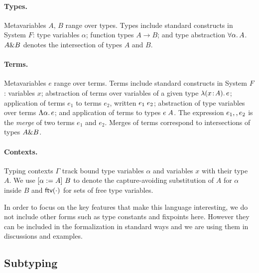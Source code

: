 \paragraph{Types.} Metavariables $A$, $B$ range over types. Types include
standard constructs in System $F$: type variables $\alpha$; function types $A
\to B$; and type abstraction $\forall \alpha.\, A$. $A \& B$ denotes the
intersection of types $A$ and $B$.

\paragraph{Terms.} Metavariables $e$ range over terms.  Terms include standard
constructs in System $F$: variables $x$; abstraction of terms over variables of
a given type $\lambda (x \!:\! A).\, e$; application of terms $e_1$ to terms $e_2$, written
$e_1 \; e_2$; abstraction of type variables over terms $\Lambda \alpha.\, e$;
and application of terms to types $e \; A$. The expression $e_1 ,, e_2$ is the
\emph{merge} of two terms $e_1$ and $e_2$.
Merges of terms correspond to intersections of types $A \& B$.

\paragraph{Contexts.} Typing contexts $ \Gamma $ track bound type variables
$\alpha$ and variables $x$ with their type $A$. We use $\lbrack \alpha := A \rbrack~ {B}$
to denote the capture-avoiding substitution of $A$ for $\alpha$ inside $B$ and
$\textsf{ftv}(\cdot)$ for sets of free type variables.

In order to focus on the key features that make this language interesting, we do
not include other forms such as type constants
and fixpoints here. However they can be included in the formalization in
standard ways and we are using them in discussions and examples.


\subsection{Subtyping}

